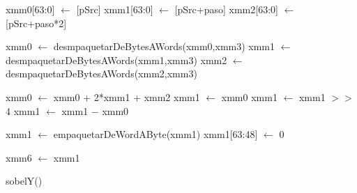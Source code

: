 \documentclass[11pt, a4paper]{article}
\begin{document}
   \begin{algorithm}[H]
     \SetLine
    	xmm0[63:0] $\leftarrow$ [pSrc]\;
			xmm1[63:0] $\leftarrow$ [pSrc+paso]\;
			xmm2[63:0] $\leftarrow$ [pSrc+paso*2]\;
			
			xmm0 $\leftarrow$ desmpaquetarDeBytesAWords(xmm0,xmm3)\;
			xmm1 $\leftarrow$ desmpaquetarDeBytesAWords(xmm1,xmm3)\;
			xmm2 $\leftarrow$ desmpaquetarDeBytesAWords(xmm2,xmm3)\;
			
			xmm0 $\leftarrow$ xmm0 + 2*xmm1 + xmm2\;
			xmm1 $\leftarrow$ xmm0\;
			xmm1 $\leftarrow$ xmm1 $>>$4
			xmm1 $\leftarrow$ xmm1 $-$ xmm0\;
			
			xmm1 $\leftarrow$ empaquetarDeWordAByte(xmm1)\;
			xmm1[63:48] $\leftarrow$ 0\;
			
			xmm6 $\leftarrow$ xmm1\;
			
			
			
     \caption{sobelY()}
   \end{algorithm}
\end{document}
